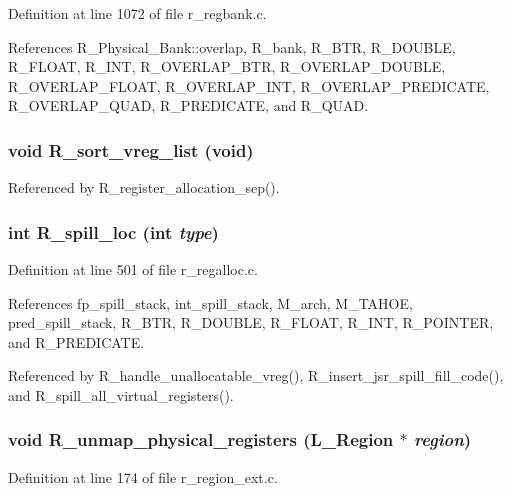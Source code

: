 Definition at line 1072 of file r\_\-regbank.c.

References R\_\-Physical\_\-Bank::overlap, R\_\-bank, R\_\-BTR, R\_\-DOUBLE, R\_\-FLOAT, R\_\-INT, R\_\-OVERLAP\_\-BTR, R\_\-OVERLAP\_\-DOUBLE, R\_\-OVERLAP\_\-FLOAT, R\_\-OVERLAP\_\-INT, R\_\-OVERLAP\_\-PREDICATE, R\_\-OVERLAP\_\-QUAD, R\_\-PREDICATE, and R\_\-QUAD.
\subsubsection{\setlength{\rightskip}{0pt plus 5cm}void R\_\-sort\_\-vreg\_\-list (void)}\label{r__regproto_8h_1e6e330cdf292a3c9e575f79ed5cc50f}




Referenced by R\_\-register\_\-allocation\_\-sep().
\subsubsection{\setlength{\rightskip}{0pt plus 5cm}int R\_\-spill\_\-loc (int {\em type})}\label{r__regproto_8h_bcc7719c977164ae16e65ad0a30d400e}




Definition at line 501 of file r\_\-regalloc.c.

References fp\_\-spill\_\-stack, int\_\-spill\_\-stack, M\_\-arch, M\_\-TAHOE, pred\_\-spill\_\-stack, R\_\-BTR, R\_\-DOUBLE, R\_\-FLOAT, R\_\-INT, R\_\-POINTER, and R\_\-PREDICATE.

Referenced by R\_\-handle\_\-unallocatable\_\-vreg(), R\_\-insert\_\-jsr\_\-spill\_\-fill\_\-code(), and R\_\-spill\_\-all\_\-virtual\_\-registers().
\subsubsection{\setlength{\rightskip}{0pt plus 5cm}void R\_\-unmap\_\-physical\_\-registers (L\_\-Region $\ast$ {\em region})}\label{r__regproto_8h_f2ff9af6d93487431a3e31b787ac33ac}




Definition at line 174 of file r\_\-region\_\-ext.c.

